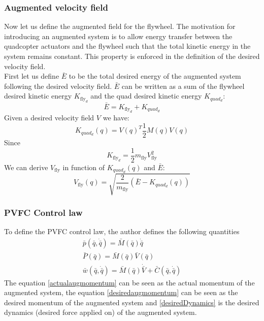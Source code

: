 \subsubsection{Augmented velocity field}
Now let us define the augmented field for the flywheel. The motivation for introducing an augmented system is
to allow energy transfer between the quadcopter actuators and the flywheel such that the total kinetic energy in the system remains constant.
This property is enforced in the definition of the desired velocity field. \\
First let us define $\bar{E}$ to be the total desired energy of the augmented system following the desired velocity field.
$\bar{E}$ can be written as a sum of the flywheel desired kinetic energy $K_{\text{fly}_{d}}$ and the quad desired kinetic energy $K_{quad_{d}}$: 
\begin{equation}
    \bar{E} = K_{\text{fly}_{d}} + K_{quad_{d}}
\end{equation}
Given a desired velocity field $V$ we have: 
\begin{equation}
    K_{quad_{d}}(q) = V(q)^T\frac{1}{2}M(q)V(q)
\end{equation}
Since 
\begin{equation}
    K_{\text{fly}_{d}} = \frac{1}{2} m_{\text{fly}} V^2_{\text{fly}}
\end{equation}
We can derive $V_{\text{fly}}$ in function of  $K_{quad_{d}}(q)$ and $\bar{E}$:
\begin{equation}
    V_{\text{fly}}(q) = \sqrt{\frac{2}{m_{\text{fly}}}(\bar{E}- K_{quad_{d}}(q))} \label{eqn:vfly}
\end{equation}
\subsubsection{PVFC Control law}
To define the PVFC control law, the author defines the following quantities
\begin{align}
    \bar{p}(\bar{q}, \dot{\bar{q}}) = \bar{M}(\bar{q})\dot{\bar{q}} \label{actualaugmomentum}\\
    \bar{P}(\bar{q}) = \bar{M}(\bar{q})\bar{V}(\bar{q}) \label{desiredaugmomentum}\\
    \bar{w}(\bar{q}, \dot{\bar{q}}) = \bar{M}(\bar{q})\dot{\bar{V}} + \bar{C}(\bar{q}, \dot{\bar{q}}) \label{desiredDynamics}
\end{align}
The equation \ref{actualaugmomentum} can be seen as the actual momentum of the augmented system, the equation \ref{desiredaugmomentum} can be seen 
as the desired momentum of the augmented system and \ref{desiredDynamics} is the desired dynamics (desired force applied on) of the augmented system.


